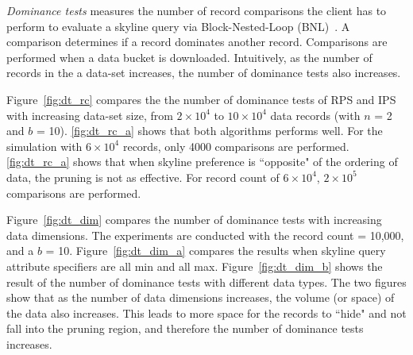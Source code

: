 \emph{Dominance tests} measures the number of record comparisons the client has to perform to evaluate a skyline query via Block-Nested-Loop (BNL)~\cite{conf/icde/BorzsonyiKS01}. A comparison determines if a record dominates another record. Comparisons are performed when a data bucket is downloaded. Intuitively, as the number of records in the a data-set increases, the number of dominance tests also increases.

Figure~\ref{fig:dt_rc} compares the the number of dominance tests of RPS and IPS with increasing data-set size, from $2\times10^4$ to $10\times10^4$ data records (with $n$ = 2 and $b$ = 10). \ref{fig:dt_rc_a} shows that both algorithms performs well. For the simulation with $6\times10^4$ records, only 4000 comparisons are performed. \ref{fig:dt_rc_a} shows that when skyline preference is ``opposite" of the ordering of data, the pruning is not as effective. For record count of $6\times10^4$, $2\times10^5$ comparisons are performed.


Figure~\ref{fig:dt_dim} compares the number of dominance tests with increasing data dimensions. The experiments are conducted with the record count = 10,000, and a $b$ = 10. Figure~\ref{fig:dt_dim_a} compares the results when skyline query attribute specifiers are all min and all max. Figure~\ref{fig:dt_dim_b} shows the result of the number of dominance tests with different data types. The two figures show that as the number of data dimensions increases, the volume (or space) of the data also increases. This leads to more space for the records to ``hide" and not fall into the pruning region, and therefore the number of dominance tests increases.

